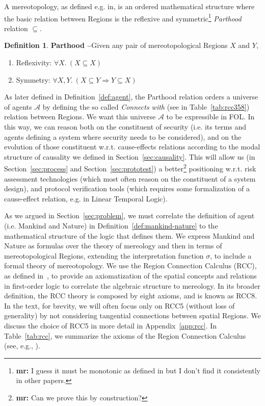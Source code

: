 \documentclass{article}
\newcommand{\fixnote}[2]{\textbf{\color{red}{FIX}}\footnote{{\bf #1:} #2}}
\theoremstyle{definition}
\newtheorem{definition}{Definition}[section]
\theoremstyle{corollary}
\theoremstyle{lemma}
\theoremstyle{theorem}
\theoremstyle{theorem}
\newcommand{\interpretation}{\sigma}
\newcommand{\agentuniverse}{\mathcal{A}}
\begin{document}
A mereotopology, as defined e.g. in\autocite{Rachavelpula2017mereotopology},
is an ordered mathematical structure where the basic relation between Regions is the
reflexive and symmetric\fixnote{mr}{I guess it must be monotonic as defined in\autocite{Rachavelpula2017mereotopology} but I don't find it consistently in other papers.} 
\emph{Parthood} relation $\subseteq$. 
\begin{definition}{\bf Parthood --}\label{def:parthood}
Given any pair of mereotopological Regions $X$ and $Y$,
	\begin{enumerate}[noitemsep]
		\item Reflexivity: $\forall X.~ (X\subseteq X)$
		\item Symmetry: $\forall X, Y.~ (X\subseteq Y \Rightarrow Y\subseteq X)$
	\end{enumerate}
\end{definition}

As later defined in Definition~\ref{def:agent}, 
the Parthood relation orders a universe of agents $\agentuniverse$ by defining
the so called \emph{Connects with} (see in Table~\ref{tab:rcc358}) relation 
between Regions. We want this universe $\agentuniverse$ to be 
expressible in FOL. In this way, we
can reason both on the constituent of security (i.e. its terms and agents
defining a system where security needs to be considered), and on 
the evolution of those constituent w.r.t. cause-effects relations according
to the modal structure of causality we defined in Section~\ref{sec:causality}.
This will allow us (in Section~\ref{sec:process} and Section~\ref{sec:prototest})
a better\fixnote{mr}{Can we prove this by construction?} 
positioning w.r.t. risk assessment technologies
(which most often reason on the constituent of a system design), and
protocol verification tools (which requires some formalization of a cause-effect relation, e.g.
in Linear Temporal Logic).

As we argued in Section~\ref{sec:problem}, we must correlate the definition of
agent (i.e. Mankind and Nature) in Definition~\ref{def:mankind-nature} to the
mathematical structure of the logic that defines them.  We express Mankind and
Nature as formulas over the theory of mereology and then in terms of
mereotopological Regions, extending the interpretation function
$\interpretation$, to include a formal theory of mereotopology.  We use the
Region Connection Calculus (RCC), as defined
in~\cite{bennettLogics,improvingRCC}, to provide an axiomatization of the
spatial concepts and relations in first-order logic to correlate the algebraic
structure to mereology. In its broader definition, the RCC theory is composed
by eight axioms, and is known as RCC8. In the text, for brevity, 
we will often focus only on RCC5 (without
loss of generality) by not considering tangential connections between spatial
Regions. We discuss the choice of RCC5 in more detail in
Appendix~\ref{app:rcc}. In Table~\ref{tab:rcc}, we
summarize the axioms of the Region Connection Calculus (see, e.g., \autocite{Grutter2008rcc}).
\end{document}
